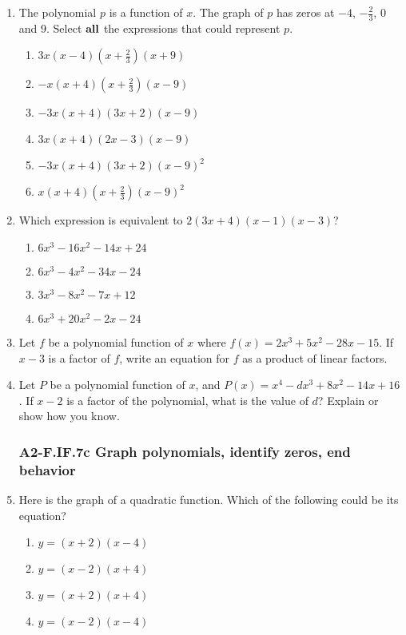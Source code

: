 \documentclass[12pt, twoside]{article}
\begin{document}
\begin{enumerate}
\item The polynomial $p$ is a function of $x$. The graph of $p$ has zeros at $-4$, $-\frac{2}{3}$, $0$ and $9$. Select $\bf{all}$ the expressions that could represent $p$. \vspace{0.25cm}
    \begin{multicols}{2}
    \begin{enumerate}
        \item $3x(x-4)(x+\frac{2}{3})(x+9)$
        \item $-x(x+4)(x+\frac{2}{3})(x-9)$
        \item $-3x(x+4)(3x+2)(x-9)$
        \item $3x(x+4)(2x-3)(x-9)$
        \item $-3x(x+4)(3x+2)(x-9)^2$
        \item $x(x+4)(x+\frac{2}{3})(x-9)^2$
    \end{enumerate}
    \end{multicols}
        \vspace{0.25cm}

\item Which expression is equivalent to $2(3x+4)(x-1)(x-3)$? \vspace{0.25cm}
    \begin{enumerate}
        \item $6x^3-16x^2-14x+24$ 
        \item $6x^3-4x^2-34x-24$ 
        \item $3x^3-8x^2-7x+12$ 
        \item $6x^3+20x^2-2x-24$ 
    \end{enumerate} \vspace{0.25cm}

\item Let $f$ be a polynomial function of $x$ where $f(x)=2x^3+5x^2-28x-15$. If $x-3$ is a factor of $f$, write an equation for $f$ as a product of linear factors.
\vspace{5cm}

\newpage
\item Let $P$ be a polynomial function of $x$, and $P(x)=x^4-dx^3+8x^2-14x+16$. If $x-2$ is a factor of the polynomial, what is the value of $d$? Explain or show how you know.
\vspace{5cm}

\subsubsection*{A2-F.IF.7c Graph polynomials, identify zeros, end behavior}
\item Here is the graph of a quadratic function. Which of the following could be its equation?
\begin{multicols}{2}
    \begin{enumerate}
        \item $y=(x+2)(x-4)$
        \item $y=(x-2)(x+4)$
        \item $y=(x+2)(x+4)$
        \item $y=(x-2)(x-4)$
    \end{enumerate}%


\end{multicols}
\end{enumerate}
\end{document}
